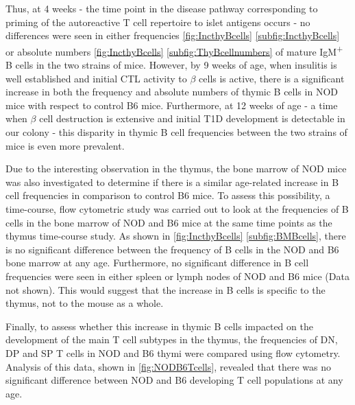 Thus, at 4 weeks - the time point in the disease pathway corresponding to priming of the autoreactive T cell repertoire to islet antigens occurs - no differences were seen in either frequencies \cref{fig:IncthyBcells} \ref{subfig:IncthyBcells} or absolute numbers \cref{fig:IncthyBcells} \ref{subfig:ThyBcellnumbers} of mature IgM\textsuperscript{+} B cells in the two strains of mice. 
However, by 9 weeks of age, when insulitis is well established and initial CTL activity to $\beta$ cells is active, there is a significant increase in both the frequency and absolute numbers of thymic B cells in NOD mice with respect to control B6 mice. 
Furthermore, at 12 weeks of age - a time when $\beta$ cell destruction is extensive and initial T1D development is detectable in our colony - this disparity in thymic B cell frequencies between the two strains of mice is even more prevalent.


Due to the interesting observation in the thymus, the bone marrow of NOD mice was also investigated to determine if there is a similar age-related increase in B cell frequencies in comparison to control B6 mice.
To assess this possibility, a time-course, flow cytometric study was carried out to look at the frequencies of B cells in the bone marrow of NOD and B6 mice at the same time points as the thymus time-course study.
As shown in \cref{fig:IncthyBcells} \ref{subfig:BMBcells}, there is no significant difference between the frequency of B cells in the NOD and B6 bone marrow at any age.
Furthermore, no significant difference in B cell frequencies were seen in either spleen or lymph nodes of NOD and B6 mice (Data not shown).
This would suggest that the increase in B cells is specific to the thymus, not to the mouse as a whole.

Finally, to assess whether this increase in thymic B cells impacted on the development of the main T cell subtypes in the thymus, the frequencies of DN, DP and SP T cells in NOD and B6 thymi were compared using flow cytometry.
Analysis of this data, shown in \cref{fig:NODB6Tcells}, revealed that there was no significant difference between NOD and B6 developing T cell populations at any age.


